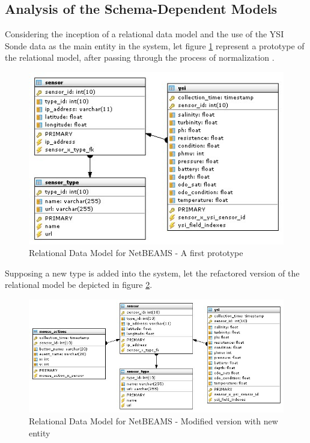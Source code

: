 \subsection{Analysis of the Schema-Dependent Models}

Considering the inception of a relational data model \cite{relational-model} and
the use of the YSI Sonde data as the main entity in the system, let figure 
\ref{fig:Relational-Model-Original} represent a prototype of the relational
model, after passing through the process of normalization
\cite{db-normalization}.

\begin{figure}
  \centering
  \includegraphics[scale=0.65]{../diagrams/Relational-Model-Original}
  \caption{Relational Data Model for NetBEAMS - A first prototype}
  \label{fig:Relational-Model-Original}
\end{figure}

Supposing a new type is added into the system, let the refactored
version of the relational model be depicted in figure
\ref{fig:Relational-Model-Addition-Modified}.

\begin{figure}
  \centering
  \includegraphics[scale=0.65]{../diagrams/Relational-Model-Addition-Modified}
  \caption{Relational Data Model for NetBEAMS - Modified version with new
  entity}
  \label{fig:Relational-Model-Addition-Modified}
\end{figure}

